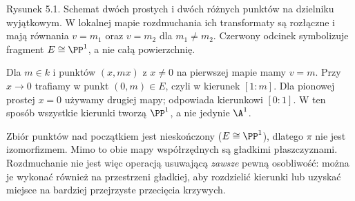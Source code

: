 \begin{center}

{\small Rysunek 5.1. Schemat dwóch prostych i dwóch różnych punktów na dzielniku wyjątkowym. W lokalnej mapie rozdmuchania ich transformaty są rozłączne i mają równania $v=m_1$ oraz $v=m_2$ dla $m_1\ne m_2$. Czerwony odcinek symbolizuje fragment $E\cong\PP^1$, a nie całą powierzchnię.}\par
\end{center}

\begin{przyklad}
Dla $m\in k$ i punktów $(x,mx)$ z $x\ne0$ na
pierwszej mapie mamy $v=m$. Przy $x\to0$ trafiamy
w punkt $(0,m)\in E$, czyli w kierunek $[1:m]$.
Dla pionowej prostej $x=0$ używamy drugiej mapy;
odpowiada kierunkowi $[0:1]$. W ten sposób wszystkie
kierunki tworzą $\PP^1$, a nie jedynie $\A^1$.
\end{przyklad}

\begin{przyklad}
Zbiór punktów nad początkiem jest nieskończony
($E\cong\PP^1$), dlatego $\pi$ nie jest
izomorfizmem. Mimo to obie mapy współrzędnych są
gładkimi płaszczyznami. Rozdmuchanie nie jest więc
operacją usuwającą \emph{zawsze} pewną osobliwość:
można je wykonać również na przestrzeni gładkiej,
aby rozdzielić kierunki lub uzyskać miejsce na
bardziej przejrzyste przecięcia krzywych.
\end{przyklad}

